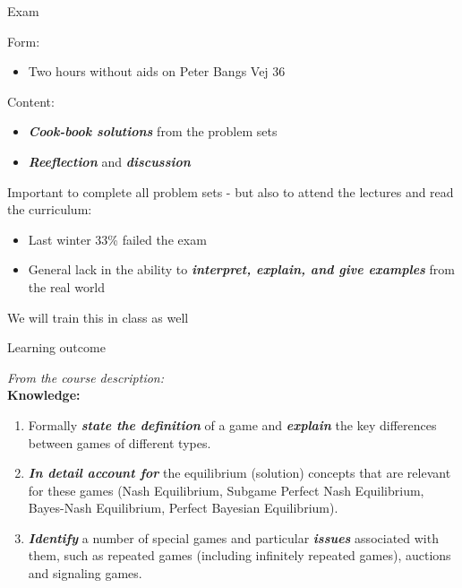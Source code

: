 \begin{frame}{Exam}
\begin{multicols}{2}\color{lightgray}
Form:
\begin{itemize}\color{lightgray}
  \item[\textcolor{lightgray}{\textbullet}] Two hours without aids on Peter Bangs Vej 36
\end{itemize}
Content:
\begin{itemize}\color{lightgray}
  \item[\textcolor{lightgray}{\textbullet}] \textit{\textbf{Cook-book solutions}} from the problem sets
  \item[\textcolor{lightgray}{\textbullet}] \textit{\textbf{Reeflection}} and \textit{\textbf{discussion}}
\end{itemize}
\vfill\null
\columnbreak\color{black}
Important to complete all problem sets - but also to attend the lectures and read the curriculum:
\begin{itemize}
  \item Last winter 33\% failed the exam
  \item General lack in the ability to \textit{\textbf{interpret, explain, and give examples}} from the real world
\end{itemize}
We will train this in class as well
\end{multicols}
\end{frame}

\begin{frame}{Learning outcome}
\begin{multicols}{2}
  \textit{From the course description:}
  \\\medskip
  \textbf{Knowledge:}
  \begin{enumerate}
    \item Formally \textit{\textbf{state the definition}} of a game and \textit{\textbf{explain}} the key differences between games of different types.
    \item \textit{\textbf{In detail account for}} the equilibrium (solution) concepts that are relevant for these games (Nash Equilibrium, Subgame Perfect Nash Equilibrium, Bayes-Nash Equilibrium, Perfect Bayesian Equilibrium).
    \item \textit{\textbf{Identify}} a number of special games and particular \textit{\textbf{issues}} associated with them, such as repeated games (including infinitely repeated games), auctions and signaling games.
  \end{enumerate}
\columnbreak
\vfill\null
\end{multicols}
\end{frame}


